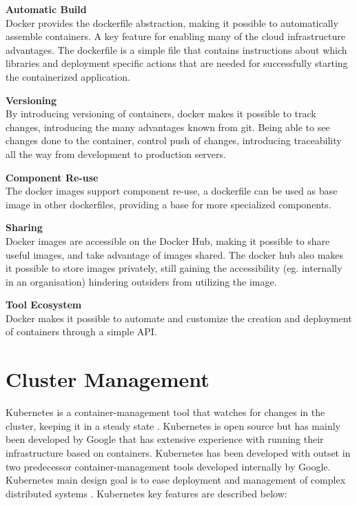 \textbf{Automatic Build}\\
Docker provides the dockerfile abstraction, making it possible to automatically assemble containers. A key feature for enabling many of the cloud infrastructure advantages. The dockerfile is a simple file that contains instructions about which libraries and deployment specific actions that are needed for successfully starting the containerized application.

\textbf{Versioning}\\
By introducing versioning of containers, docker makes it possible to track changes, introducing the many advantages known from git. Being able to see changes done to the container, control push of changes, introducing traceability all the way from development to production servers.

\textbf{Component Re-use}\\
The docker images support component re-use, a dockerfile can be used as base image in other dockerfiles, providing a base for more specialized components.

\textbf{Sharing}\\
Docker images are accessible on the Docker Hub, making it possible to share useful images, and take advantage of images shared. The docker hub also makes it possible to store images privately, still gaining the accessibility (eg. internally in an organisation) hindering outsiders from utilizing the image.

\textbf{Tool Ecosystem}\\
Docker makes it possible to automate and customize the creation and deployment of containers through a simple API.

\section{Cluster Management}
\label{sec:cluster}
Kubernetes is a container-management tool that watches for changes in the cluster, keeping it in a steady state \cite{burns2016borg}. Kubernetes is open source but has mainly been developed by Google that has extensive experience with running their infrastructure based on containers. Kubernetes has been developed with outset in two predecessor container-management tools developed internally by Google. Kubernetes main design goal is to ease deployment and management of complex distributed systems \cite{kubernetes_frontpage}. Kubernetes key features are described below:

